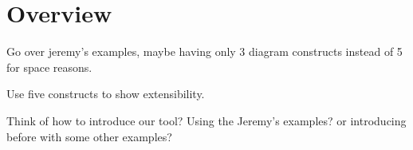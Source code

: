 \section{Overview}

Go over jeremy's examples, maybe having only 3 diagram 
constructs instead of 5 for space reasons. 

Use five constructs to show extensibility.


Think of how to introduce our tool? Using the Jeremy's examples? 
or introducing before with some other examples?  
